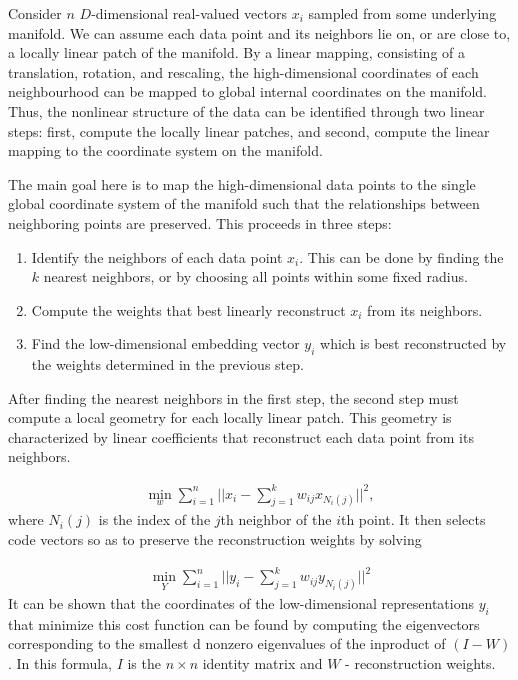 \documentclass[a4paper]{article}
\begin{document}
Consider $n$ $D$-dimensional real-valued vectors $x_i$ sampled from some underlying manifold. We can assume each
data point and its neighbors lie on, or are close to, a locally linear patch of the manifold. By a linear mapping,
consisting of a translation, rotation, and rescaling, the high-dimensional coordinates of each neighbourhood can be
mapped to global internal coordinates on the manifold. Thus, the nonlinear structure of the data can be identified
through two linear steps: first, compute the locally linear patches, and second, compute the linear mapping to the
coordinate system on the manifold.

The main goal here is to map the high-dimensional data points to the single global coordinate system of the
manifold such that the relationships between neighboring points are preserved. This proceeds in three steps:

\begin{enumerate}
  \item Identify the neighbors of each data point $x_i$. This can be done by finding the $k$ nearest neighbors, or by choosing
all points within some fixed radius.
  \item Compute the weights that best linearly reconstruct $x_i$ from its neighbors.
  \item Find the low-dimensional embedding vector $y_i$ which is best reconstructed by the weights determined in the
previous step.
\end{enumerate}

After finding the nearest neighbors in the first step, the second step must compute a local geometry for each locally
linear patch. This geometry is characterized by linear coefficients that reconstruct each data point from its neighbors.

\begin{align*}
 \min_w \sum_{i=1}^n ||x_i - \sum_{j=1}^k w_{ij}x_{N_i(j)}||^2,
\end{align*}
where $N_i(j)$ is the index of the $j$th neighbor of the $i$th point. It then selects code vectors so as to preserve the
reconstruction weights by solving

\begin{align*}
 \min_Y \sum_{i=1}^n ||y_i - \sum_{j=1}^k w_{ij}y_{N_i(j)}||^2
\end{align*}
It can be shown that the coordinates of the low-dimensional representations $y_i$ that minimize this cost function can be
found by computing the eigenvectors corresponding to the smallest d
nonzero eigenvalues of the inproduct of $(I - W)$.
In this formula, $I$ is the $n \times n$ identity matrix and $W$ - reconstruction weights.
\end{document}
